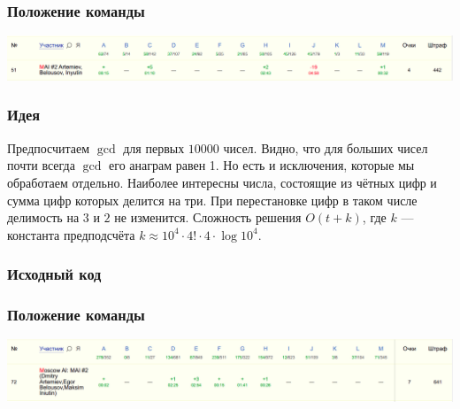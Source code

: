 \documentclass[12pt]{article}
\begin{document}
\subsubsection*{Положение команды}
\includegraphics[scale=0.25]{images/gp_nanjing.png}\newline\noindent
\pagebreak


\subsubsection*{Идея}
Предпосчитаем $\gcd$ для первых $10000$ чисел. Видно, что для больших чисел почти всегда $\gcd$ его анаграм равен 1. Но есть и исключения, которые мы обработаем отдельно. Наиболее интересны числа, состоящие из чётных цифр и сумма цифр которых делится на три. При перестановке цифр в таком числе делимость на $3$ и $2$ не изменится. Сложность решения $O(t +k)$, где $k$ --- константа предподсчёта $k \approx 10 ^ 4 \cdot 4! \cdot 4 \cdot \log{10 ^ 4}$.
\subsubsection*{Исходный код}

\subsubsection*{Положение команды}
\includegraphics[scale=0.25]{images/moscow_regional.png}\newline\noindent
\pagebreak
\end{document}
